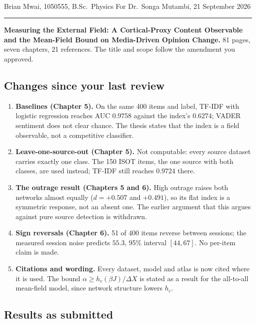 \documentclass[11pt,a4paper]{article}
\begin{document}
\\[2pt]
Brian Mwai, 1050555, B.Sc.\ Physics \hfill For Dr.\ Songa Mutambi, 21 September 2026

\vspace{6pt}\hrule\vspace{8pt}

\noindent\textbf{Measuring the External Field: A Cortical-Proxy Content Observable and the
Mean-Field Bound on Media-Driven Opinion Change.} 81 pages, seven chapters, 21 references.
The title and scope follow the amendment you approved.

\subsection*{Changes since your last review}

\begin{enumerate}[leftmargin=*]
\item \textbf{Baselines (Chapter 5).} On the same 400 items and label, TF-IDF with logistic
regression reaches AUC $0.9758$ against the index's $0.6274$; VADER sentiment does not clear
chance. The thesis states that the index is a field observable, not a competitive classifier.
\item \textbf{Leave-one-source-out (Chapter 5).} Not computable: every source dataset carries
exactly one class. The 150 ISOT items, the one source with both classes, are used instead;
TF-IDF still reaches $0.9724$ there.
\item \textbf{The outrage result (Chapters 5 and 6).} High outrage raises both networks
almost equally ($d = +0.507$ and $+0.491$), so its flat index is a symmetric response, not an
absent one. The earlier argument that this argues against pure source detection is withdrawn.
\item \textbf{Sign reversals (Chapter 6).} 51 of 400 items reverse between sessions; the
measured session noise predicts $55.3$, 95\% interval $[44, 67]$. No per-item claim is made.
\item \textbf{Citations and wording.} Every dataset, model and atlas is now cited where it is
used. The bound $\alpha \ge h_c(\beta J)/\Delta X$ is stated as a result for the all-to-all
mean-field model, since network structure lowers $h_c$.
\end{enumerate}

\subsection*{Results as submitted}
\end{document}
